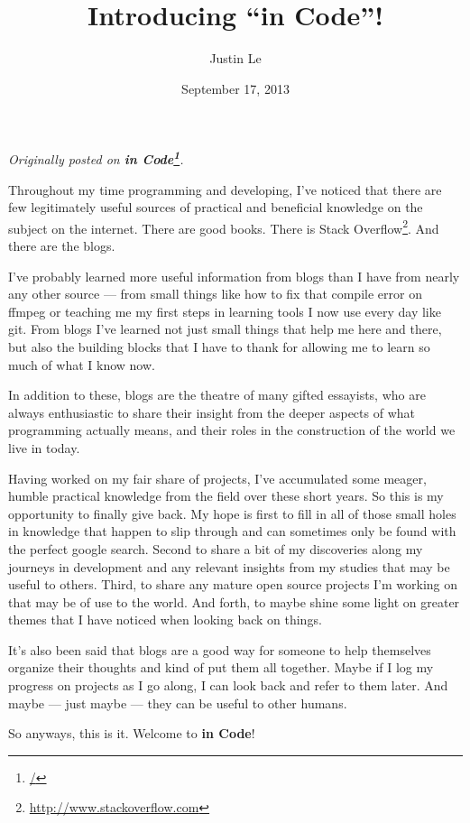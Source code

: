 \documentclass[]{article}
\title{Introducing ``in Code''!}
\author{Justin Le}
\date{September 17, 2013}
\renewcommand{\href}[2]{#2\footnote{\url{#1}}}
\begin{document}
\maketitle

\emph{Originally posted on \textbf{\href{/}{in Code}}.}

Throughout my time programming and developing, I've noticed that there
are few legitimately useful sources of practical and beneficial
knowledge on the subject on the internet. There are good books. There is
\href{http://www.stackoverflow.com}{Stack Overflow}. And there are the
blogs.

I've probably learned more useful information from blogs than I have
from nearly any other source --- from small things like how to fix that
compile error on ffmpeg or teaching me my first steps in learning tools
I now use every day like git. From blogs I've learned not just small
things that help me here and there, but also the building blocks that I
have to thank for allowing me to learn so much of what I know now.

In addition to these, blogs are the theatre of many gifted essayists,
who are always enthusiastic to share their insight from the deeper
aspects of what programming actually means, and their roles in the
construction of the world we live in today.

Having worked on my fair share of projects, I've accumulated some
meager, humble practical knowledge from the field over these short
years. So this is my opportunity to finally give back. My hope is first
to fill in all of those small holes in knowledge that happen to slip
through and can sometimes only be found with the perfect google search.
Second to share a bit of my discoveries along my journeys in development
and any relevant insights from my studies that may be useful to others.
Third, to share any mature open source projects I'm working on that may
be of use to the world. And forth, to maybe shine some light on greater
themes that I have noticed when looking back on things.

It's also been said that blogs are a good way for someone to help
themselves organize their thoughts and kind of put them all together.
Maybe if I log my progress on projects as I go along, I can look back
and refer to them later. And maybe --- just maybe --- they can be useful
to other humans.

So anyways, this is it. Welcome to \textbf{in Code}!
\end{document}
